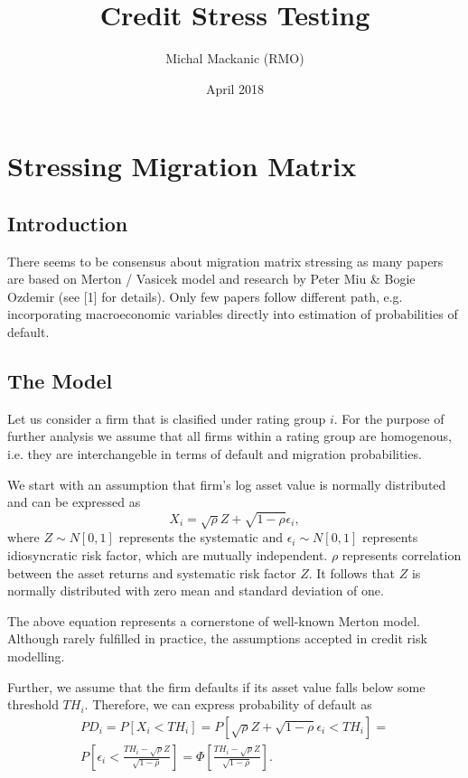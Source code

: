 \documentclass[a4paper]{article}
\begin{document}
\title{Credit Stress Testing}
\author{Michal Mackanic (RMO)}
\date{April 2018}
\maketitle

\tableofcontents{}

\section{Stressing Migration Matrix}

\subsection{Introduction}
There seems to be consensus about migration matrix stressing as many
papers are based on Merton / Vasicek model and research by Peter Miu 
\& Bogie Ozdemir (see [1] for details). Only few papers follow different path, e.g. 
incorporating macroeconomic variables directly into estimation of 
probabilities of default.

\subsection{The Model}

Let us consider a firm that is clasified under rating group $i$. For the 
purpose of further analysis we assume that all firms within a 
rating group are homogenous, i.e. they are interchangeble in 
terms of default and migration probabilities.

We start with an assumption that firm's log asset value is normally distributed and can be expressed as
\begin{equation}
X_i = \sqrt{\rho} Z  + \sqrt{1 - \rho} \epsilon_i,
\end{equation}
where $Z \sim N[0, 1]$ represents the systematic and $\epsilon_i \sim 
N[0, 1]$ represents idiosyncratic risk factor, which are mutually independent. 
$\rho$ represents correlation between the asset returns and systematic 
risk factor $Z$. It follows that $Z$ is normally distributed with zero mean and standard deviation of one.

The above equation represents a cornerstone of 
well-known Merton model. Although rarely 
fulfilled in practice, the assumptions accepted in credit risk modelling.

Further, we assume that the firm defaults if its asset value falls 
below some threshold $TH_i$. Therefore, we can express probability of default as
\begin{multline}
PD_i = P[X_i < TH_i] = P[\sqrt{\rho}Z + \sqrt{1 - \rho} 
\epsilon_i < TH_i]=\\
P\left[\epsilon_i < \frac{TH_i - \sqrt{\rho}Z}{\sqrt{1 - 
\rho}}\right] = \Phi\left[\frac{TH_i - \sqrt{\rho}Z}{\sqrt{1 - 
\rho}}\right].
\end{multline}
\end{document}
